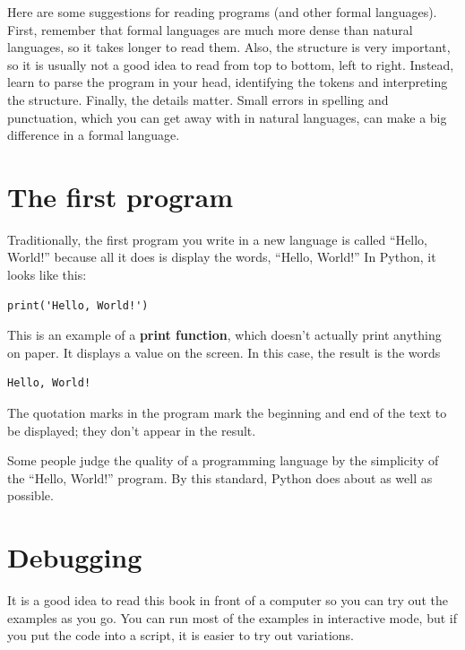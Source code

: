 \documentclass[10pt]{book}
\begin{document}
Here are some suggestions for reading programs (and other formal
languages).  First, remember that formal languages are much more dense
than natural languages, so it takes longer to read them.  Also, the
structure is very important, so it is usually not a good idea to read
from top to bottom, left to right.  Instead, learn to parse the
program in your head, identifying the tokens and interpreting the
structure.  Finally, the details matter.  Small errors in
spelling and punctuation, which you can get away
with in natural languages, can make a big difference in a formal
language.

\section{The first program}
\label{hello}


Traditionally, the first program you write in a new language
is called ``Hello, World!'' because all it does is display the
words, ``Hello, World!''  In Python, it looks like this:

\beforeverb
\begin{verbatim}
print('Hello, World!')
\end{verbatim}
\afterverb
%
This is an example of a {\bf print function}, which
doesn't actually print anything on paper.  It displays a value on the
screen.  In this case, the result is the words

\beforeverb
\begin{verbatim}
Hello, World!
\end{verbatim}
\afterverb
%
The quotation marks in the program mark the beginning and end
of the text to be displayed; they don't appear in the result.


Some people judge the quality of a programming language by the
simplicity of the ``Hello, World!'' program.  By this standard, Python
does about as well as possible.


\section{Debugging}

It is a good idea to read this book in front of a computer so you can
try out the examples as you go.  You can run most of the examples in
interactive mode, but if you put the code into a script, it is easier
to try out variations.
\end{document}

